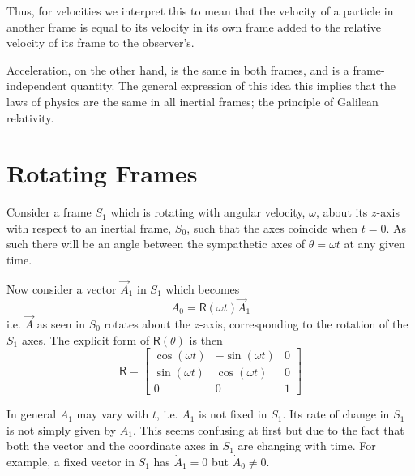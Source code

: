 Thus, for velocities we interpret this to mean that the velocity of a
particle in another frame is equal to its velocity in its own frame
added to the relative velocity of its frame to the observer's.

Acceleration, on the other hand, is the same in both frames, and is a
frame-independent quantity. The general expression of this idea this
implies that the laws of physics are the same in all inertial frames;
the principle of Galilean relativity.

\section{Rotating Frames}
\label{sec:rotating-frames}

Consider a frame $S_1$ which is rotating with angular velocity,
$\omega$, about its $z$-axis with respect to an inertial frame, $S_0$,
such that the axes coincide when $t=0$. As such there will be an angle
between the sympathetic axes of $\theta = \omega t$ at any given time.

Now consider a vector $\vec{A}_1$ in $S_1$ which becomes 
\newcommand{\mat}[1]{\mathsf{#1}}
\[A_0 = \mat{R}(\omega t) \vec{A}_1 \] i.e. $\vec{A}$ as seen in $S_0$
rotates about the $z$-axis, corresponding to the rotation of the $S_1$
axes. The explicit form of $\mat{R}(\theta)$ is then
\[ \mat{R} = 
\begin{bmatrix}
  \cos(\omega t) & - \sin(\omega t) & 0 \\
\sin(\omega t)   & \cos(\omega t)   & 0 \\
0              & 0              & 1
\end{bmatrix}
\]

In general $A_1$ may vary with $t$, i.e. $A_1$ is not fixed in
$S_1$. Its rate of change in $S_1$ is not simply given by $A_1$. This
seems confusing at first but due to the fact that both the vector and
the coordinate axes in $S_1$ are changing with time. For example, a
fixed vector in $S_1$ has $\dot{A}_1=0$ but $\dot{A}_0 \neq 0$.

